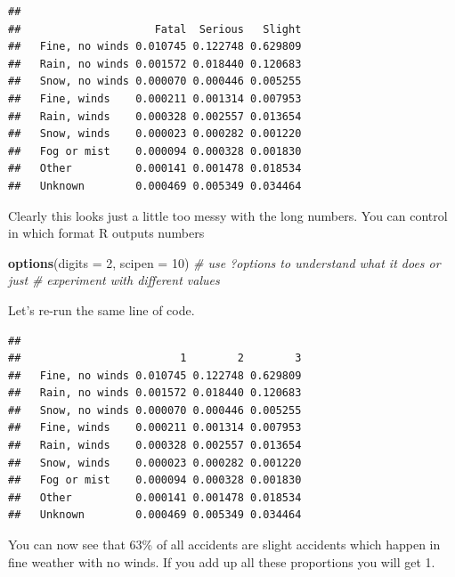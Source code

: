 \documentclass[
]{article}
\newenvironment{Shaded}{\begin{snugshade}}{\end{snugshade}}
\newcommand{\AttributeTok}[1]{\textcolor[rgb]{0.13,0.29,0.53}{#1}}
\newcommand{\CommentTok}[1]{\textcolor[rgb]{0.56,0.35,0.01}{\textit{#1}}}
\newcommand{\DecValTok}[1]{\textcolor[rgb]{0.00,0.00,0.81}{#1}}
\newcommand{\FunctionTok}[1]{\textcolor[rgb]{0.13,0.29,0.53}{\textbf{#1}}}
\newcommand{\NormalTok}[1]{#1}
\newcommand{\SpecialCharTok}[1]{\textcolor[rgb]{0.81,0.36,0.00}{\textbf{#1}}}
\begin{document}
\begin{verbatim}
##                 
##                     Fatal  Serious   Slight
##   Fine, no winds 0.010745 0.122748 0.629809
##   Rain, no winds 0.001572 0.018440 0.120683
##   Snow, no winds 0.000070 0.000446 0.005255
##   Fine, winds    0.000211 0.001314 0.007953
##   Rain, winds    0.000328 0.002557 0.013654
##   Snow, winds    0.000023 0.000282 0.001220
##   Fog or mist    0.000094 0.000328 0.001830
##   Other          0.000141 0.001478 0.018534
##   Unknown        0.000469 0.005349 0.034464
\end{verbatim}

Clearly this looks just a little too messy with the long numbers. You
can control in which format R outputs numbers

\begin{Shaded}
\begin{Highlighting}[]
\FunctionTok{options}\NormalTok{(}\AttributeTok{digits =} \DecValTok{2}\NormalTok{, }\AttributeTok{scipen =} \DecValTok{10}\NormalTok{)  }\CommentTok{\# use ?options to understand what it does or just }
                                  \CommentTok{\# experiment with different values}
\end{Highlighting}
\end{Shaded}

Let's re-run the same line of code.

\begin{Shaded}
\end{Shaded}

\begin{verbatim}
##                 
##                         1        2        3
##   Fine, no winds 0.010745 0.122748 0.629809
##   Rain, no winds 0.001572 0.018440 0.120683
##   Snow, no winds 0.000070 0.000446 0.005255
##   Fine, winds    0.000211 0.001314 0.007953
##   Rain, winds    0.000328 0.002557 0.013654
##   Snow, winds    0.000023 0.000282 0.001220
##   Fog or mist    0.000094 0.000328 0.001830
##   Other          0.000141 0.001478 0.018534
##   Unknown        0.000469 0.005349 0.034464
\end{verbatim}

You can now see that 63\% of all accidents are slight accidents which
happen in fine weather with no winds. If you add up all these
proportions you will get 1.
\end{document}
